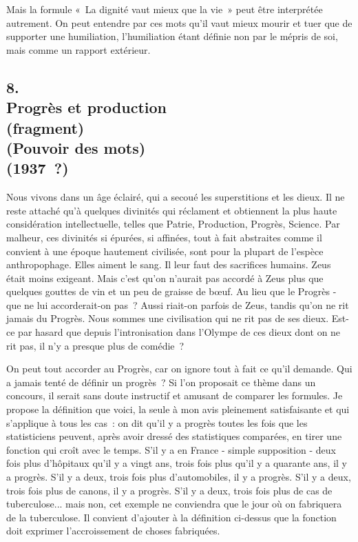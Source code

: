 \documentclass[french,twoside]{book} %
\begin{document}
Mais la formule « La dignité vaut mieux que la vie » peut être interprétée autrement. On peut entendre par ces mots qu'il vaut mieux mourir et tuer que de supporter une humiliation, l'humiliation étant définie non par le mépris de soi, mais comme un rapport extérieur.\par

\begin{center}
\end{center}
\subsection[8. Progrès et production, (fragment) (Pouvoir des mots)  (1937 ?)]{8. \\
Progrès et production \\
(fragment) \\
(Pouvoir des mots) \protect\footnotemark {\itshape  }\\
(1937 ?)}
\noindent \par
Nous vivons dans un âge éclairé, qui a secoué les superstitions et les dieux. Il ne reste attaché qu'à quelques divinités qui réclament et obtiennent la plus haute considération intellectuelle, telles que Patrie, Production, Progrès, Science. Par malheur, ces divinités si épurées, si affinées, tout à fait abstraites comme il convient à une époque hautement civilisée, sont pour la plupart de l'espèce anthropophage. Elles aiment le sang. Il leur faut des sacrifices humains. Zeus était moins exigeant. Mais c'est qu'on n'aurait pas accordé à Zeus plus que quelques gouttes de vin et un peu de graisse de bœuf. Au lieu que le Progrès - que ne lui accorderait-on pas ? Aussi riait-on parfois de Zeus, tandis qu'on ne rit jamais du Progrès. Nous sommes une civilisation qui ne rit pas de ses dieux. Est-ce par hasard que depuis l'intronisation dans l'Olympe de ces dieux dont on ne rit pas, il n'y a presque plus de comédie ?\par
On peut tout accorder au Progrès, car on ignore tout à fait ce qu'il demande. Qui a jamais tenté de définir un progrès ? Si l'on proposait ce thème dans un concours, il serait sans doute instructif et amusant de comparer les formules. Je propose la définition que voici, la seule à mon avis pleinement satisfaisante et qui s'applique à tous les cas : on dit qu'il y a progrès toutes les fois que les statisticiens peuvent, après avoir dressé des statistiques compa­rées, en tirer une fonction qui croît avec le temps. S'il y a en France - simple supposition - deux fois plus d'hôpitaux qu'il y a vingt ans, trois fois plus qu'il y a quarante ans, il y a progrès. S'il y a deux, trois fois plus d'automobiles, il y a progrès. S'il y a deux, trois fois plus de canons, il y a progrès. S'il y a deux, trois fois plus de cas de tuberculose... mais non, cet exemple ne conviendra que le jour où on fabriquera de la tuberculose. Il convient d'ajouter à la définition ci-dessus que la fonction doit exprimer l'accroissement de choses fabriquées.\par
\end{document}
